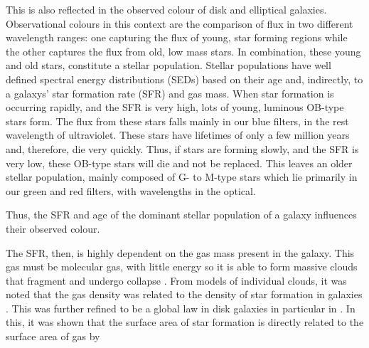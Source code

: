 This is also reflected in the observed colour of disk and elliptical galaxies. Observational colours in this context are the comparison of flux in two different wavelength ranges: one capturing the flux of young, star forming regions while the other captures the flux from old, low mass stars. In combination, these young and old stars, constitute a stellar population. Stellar populations have well defined spectral energy distributions (SEDs) based on their age and, indirectly, to a galaxys' star formation rate (SFR) and gas mass. When star formation is occurring rapidly, and the SFR is very high, lots of young, luminous OB-type stars form. The flux from these stars falls mainly in our blue filters, in the rest wavelength of ultraviolet. These stars have lifetimes of only a few million years and, therefore, die very quickly. Thus, if stars are forming slowly, and the SFR is very low, these OB-type stars will die and not be replaced. This leaves an older stellar population, mainly composed of G- to M-type stars which lie primarily in our green and red filters, with wavelengths in the optical. 
\DIFaddbegin 

\DIFaddend Thus, the SFR and age of the dominant stellar population of a galaxy influences their observed colour.

The SFR, then, is highly dependent on the gas mass present in the galaxy. This gas must be \DIFaddbegin {}\DIFaddend molecular gas, with little energy so it is able to form massive clouds that fragment and undergo collapse \citep{1965MNRAS.130...97G, 1972ApJ...176L...9Q}. From models of individual clouds, it was noted that the \DIFaddbegin {}\DIFaddend gas density was related to the density of star formation in galaxies \citep{1959ApJ...129..243S}. This was further refined to be a global law in disk galaxies in particular in \citet{1998ApJ...498..541K}. In this, it was shown that the surface area of star formation is directly related to the surface area of \DIFaddbegin {}\DIFaddend gas by 

